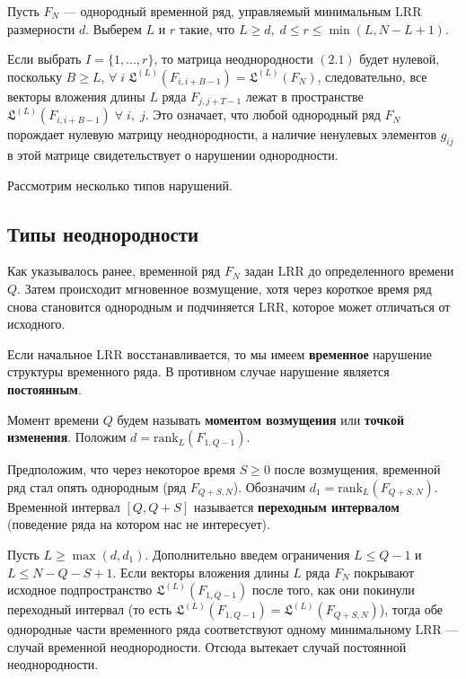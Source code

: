 \documentclass[specialist, substylefile = spbu.rtx,
			   subf, href, 12pt]{disser}
\begin{document}
Пусть $ F_N $ --- однородный временной ряд, управляемый минимальным $ \mathrm{LRR} $ размерности $ d $. Выберем $ L $ и $ r $ такие, что $ L \geq d, \; d \leq r \leq \min(L, N-L+1)$.

Если выбрать $ I = \{1, \dots, r\} $, то матрица неоднородности $ (2.1) $ будет нулевой, поскольку $ B \geq L $, $ \forall \; i \; \mathfrak{L}^{(L)}(F_{i, i+B-1}) = \mathfrak{L}^{(L)}(F_N) $, следовательно, все векторы вложения длины $ L $ ряда $ F_{j, j+T-1} $ лежат в пространстве $ \mathfrak{L}^{(L)}(F_{i, i+B-1}) \; \forall \; i,\; j $. Это означает, что любой однородный ряд $ F_N $ порождает нулевую матрицу неоднородности, а наличие ненулевых элементов $ g_{ij} $ в этой матрице свидетельствует о нарушении однородности.

Рассмотрим несколько типов нарушений.

\subsection{Типы неоднородности}

Как указывалось ранее, временной ряд $ F_N $ задан $ \mathrm{LRR} $ до определенного времени $ Q $. Затем происходит мгновенное возмущение, хотя через короткое время ряд снова становится однородным и подчиняется $ \mathrm{LRR} $, которое может отличаться от исходного.

Если начальное $ \mathrm{LRR} $ восстанавливается, то мы имеем \textbf{временное} нарушение структуры временного ряда. В противном случае нарушение является \textbf{постоянным}.

Момент времени $ Q $ будем называть \textbf{моментом возмущения} или \textbf{точкой изменения}. Положим $ d = \mathrm{rank}_L(F_{1, Q-1}) $.

Предположим, что через некоторое время $ S \geq 0 $ после возмущения, временной ряд стал опять однородным (ряд $ F_{Q+S, N} $). Обозначим $ d_1 = \mathrm{rank}_L(F_{Q+S, N}) $. Временной интервал $ [Q, Q + S] $ называется \textbf{переходным интервалом} (поведение ряда на котором нас не интересует).

Пусть $ L \geq \max(d, d_1) $. Дополнительно введем ограничения $ L \leq Q-1 $ и $ L \leq N-Q-S+1 $. Если векторы вложения длины $ L $ ряда $ F_N $ покрывают исходное подпространство $ \mathfrak{L}^{(L)}(F_{1, Q-1}) $ после того, как они покинули переходный интервал (то есть  $ \mathfrak{L}^{(L)}(F_{1, Q-1}) = \mathfrak{L}^{(L)}(F_{Q+S, N})$), тогда обе однородные части временного ряда соответствуют одному минимальному $ \mathrm{LRR} $ --- случай временной неоднородности. Отсюда вытекает случай постоянной неоднородности.
\end{document}
